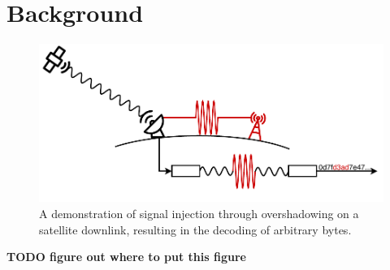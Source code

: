 \section{Background}\label{sec:background}

\begin{figure}
    \centering
    \includegraphics[width=\columnwidth]{diagrams/attack_illustration.pdf}
    \caption{A demonstration of signal injection through overshadowing on a satellite downlink, resulting in the decoding of arbitrary bytes.}
    \label{fig:attack-illustration}
\end{figure}

\textbf{TODO figure out where to put this figure}

